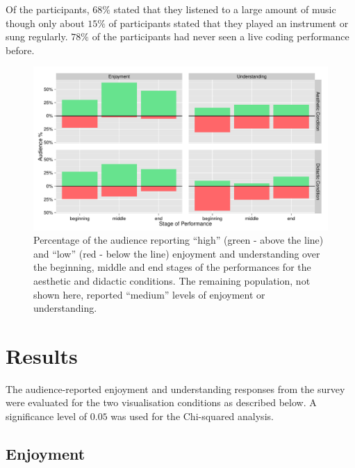 Of the participants, $68\%$ stated that they listened to a large amount of music though only about $15\%$ of participants stated that they played an instrument or sung regularly. $78\%$ of the participants had never seen a live coding performance before.

\begin{figure}
  \centering
  \includegraphics[width=\columnwidth]{../study-2/results/graphs/dimension-condition.pdf}
  \caption[User study survey condition and dimension results]{Percentage of the audience reporting ``high'' (green - above
the line) and ``low'' (red - below the line) enjoyment and
understanding over the beginning, middle and end stages of the
performances for the aesthetic and didactic conditions. The remaining
population, not shown here, reported ``medium'' levels of enjoyment or
understanding.}
  \label{fig:dimension-condition}
\end{figure}

\section{Results}

The audience-reported enjoyment and understanding responses from the survey were evaluated for the two visualisation conditions as described below. A significance level of $0.05$ was used for the Chi-squared analysis.

\subsection{Enjoyment}

